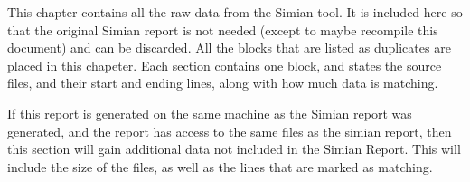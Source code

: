 \documentclass{report}[10pt]
\begin{document}
This chapter contains all the raw data from the Simian tool. It is included here so that the original Simian report is not needed (except to maybe recompile this document) and can be discarded. All the blocks that are listed as duplicates are placed in this chapeter. Each section contains one block, and states the source files, and their start and ending lines, along with how much data is matching.

If this report is generated on the same machine as the Simian report was generated, and the report has access to the same files as the simian report, then this section will gain additional data not included in the Simian Report. This will include the size of the files, as well as the lines that are marked as matching.
\end{document}
